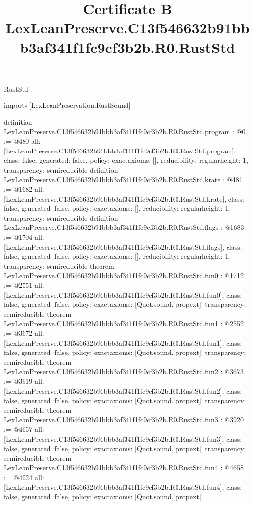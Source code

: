 \begin{lexlean}{RustStd}
\title{Certificate B LexLeanPreserve.C13f546632b91bbb3af341f1fc9cf3b2b.R0.RustStd}
\begin{coremodule}
imports [LexLeanPreservation.RustSound]

definition LexLeanPreserve.C13f546632b91bbb3af341f1fc9cf3b2b.R0.RustStd.program : @0 := @480 {
  all: [LexLeanPreserve.C13f546632b91bbb3af341f1fc9cf3b2b.R0.RustStd.program],
  class: false,
  generated: false,
  policy: exact{axioms: []},
  reducibility: regular{height: 1},
  transparency: semireducible
}
definition LexLeanPreserve.C13f546632b91bbb3af341f1fc9cf3b2b.R0.RustStd.krate : @481 := @1682 {
  all: [LexLeanPreserve.C13f546632b91bbb3af341f1fc9cf3b2b.R0.RustStd.krate],
  class: false,
  generated: false,
  policy: exact{axioms: []},
  reducibility: regular{height: 1},
  transparency: semireducible
}
definition LexLeanPreserve.C13f546632b91bbb3af341f1fc9cf3b2b.R0.RustStd.flags : @1683 := @1704 {
  all: [LexLeanPreserve.C13f546632b91bbb3af341f1fc9cf3b2b.R0.RustStd.flags],
  class: false,
  generated: false,
  policy: exact{axioms: []},
  reducibility: regular{height: 1},
  transparency: semireducible
}
theorem LexLeanPreserve.C13f546632b91bbb3af341f1fc9cf3b2b.R0.RustStd.fun0 : @1712 := @2551 {
  all: [LexLeanPreserve.C13f546632b91bbb3af341f1fc9cf3b2b.R0.RustStd.fun0],
  class: false,
  generated: false,
  policy: exact{axioms: [Quot.sound, propext]},
  transparency: semireducible
}
theorem LexLeanPreserve.C13f546632b91bbb3af341f1fc9cf3b2b.R0.RustStd.fun1 : @2552 := @3672 {
  all: [LexLeanPreserve.C13f546632b91bbb3af341f1fc9cf3b2b.R0.RustStd.fun1],
  class: false,
  generated: false,
  policy: exact{axioms: [Quot.sound, propext]},
  transparency: semireducible
}
theorem LexLeanPreserve.C13f546632b91bbb3af341f1fc9cf3b2b.R0.RustStd.fun2 : @3673 := @3919 {
  all: [LexLeanPreserve.C13f546632b91bbb3af341f1fc9cf3b2b.R0.RustStd.fun2],
  class: false,
  generated: false,
  policy: exact{axioms: [Quot.sound, propext]},
  transparency: semireducible
}
theorem LexLeanPreserve.C13f546632b91bbb3af341f1fc9cf3b2b.R0.RustStd.fun3 : @3920 := @4657 {
  all: [LexLeanPreserve.C13f546632b91bbb3af341f1fc9cf3b2b.R0.RustStd.fun3],
  class: false,
  generated: false,
  policy: exact{axioms: [Quot.sound, propext]},
  transparency: semireducible
}
theorem LexLeanPreserve.C13f546632b91bbb3af341f1fc9cf3b2b.R0.RustStd.fun4 : @4658 := @4924 {
  all: [LexLeanPreserve.C13f546632b91bbb3af341f1fc9cf3b2b.R0.RustStd.fun4],
  class: false,
  generated: false,
  policy: exact{axioms: [Quot.sound, propext]},
}
\end{coremodule}
\end{lexlean}
